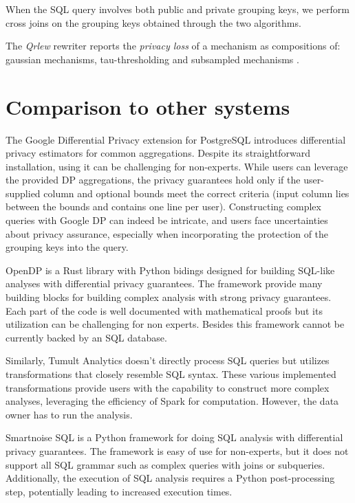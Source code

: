 \documentclass[letterpaper]{article} %
\newcommand{\qrlew}{\emph{Qrlew}}
\begin{document}
When the SQL query involves both public and private grouping keys, we perform cross joins on the grouping keys obtained through the two algorithms.

The \qrlew{} rewriter reports the \emph{privacy loss} of a mechanism as compositions of: gaussian mechanisms, tau-thresholding \cite{korolova2009releasing,wilson2019differentially} and subsampled mechanisms \cite{balle2018privacy}.

\section{Comparison to other systems}

The Google Differential Privacy extension for PostgreSQL introduces differential privacy estimators for common aggregations.
Despite its straightforward installation, using it can be challenging for non-experts.
While users can leverage the provided DP aggregations,
the privacy guarantees hold only if the user-supplied column and optional bounds meet the correct criteria (input column lies between the bounds and contains one line per user).
Constructing complex queries with Google DP can indeed be intricate, and users face uncertainties about privacy assurance,
especially when incorporating the protection of the grouping keys into the query.

OpenDP is a Rust library with Python bidings designed for building SQL-like analyses with differential privacy guarantees.
The framework provide many building blocks for building complex analysis with strong privacy guarantees.
Each part of the code is well documented with mathematical proofs but
its utilization can be challenging for non experts.
Besides this framework cannot be currently backed by an SQL database.

Similarly, Tumult Analytics doesn't directly process SQL queries but utilizes transformations that closely resemble SQL syntax.
These various implemented transformations provide users with the capability to construct more complex analyses,
leveraging the efficiency of Spark for computation.
However, the data owner has to run the analysis.

Smartnoise SQL is a Python framework for doing SQL analysis with differential privacy guarantees.
The framework is easy of use for non-experts, but it does not support all SQL grammar such as complex queries with joins or subqueries.
Additionally, the execution of SQL analysis requires a Python post-processing step, potentially leading to increased execution times.
\end{document}
